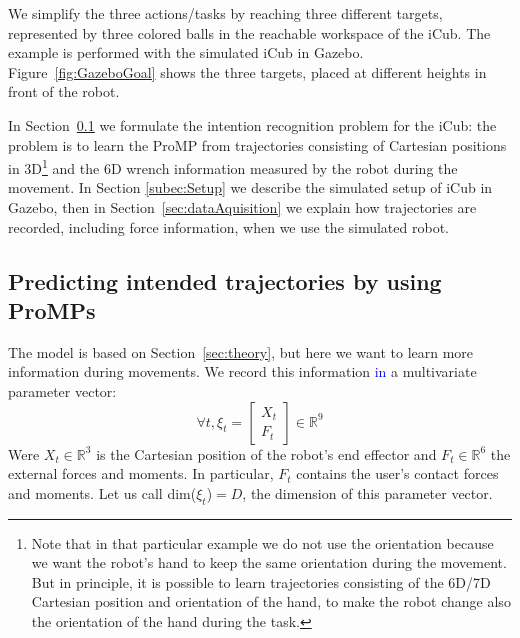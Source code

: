 \documentclass[utf8]{frontiersSCNS} %
\newcommand{\rev}[1]{\textcolor{blue}{#1}}
\begin{document}
We simplify the three actions/tasks by reaching three different targets, represented by three colored balls in the reachable workspace of the iCub. The example is performed with the simulated iCub in Gazebo. Figure~\ref{fig:GazeboGoal} shows the three targets, placed at different heights in front of the robot.

In Section~\ref{sec:formulateModelInt} we formulate the intention recognition problem for the iCub: the problem is to learn the ProMP from trajectories consisting of Cartesian positions in 3D\footnote{Note that in that particular example we do not use the orientation because we want the robot's hand to keep the same orientation during the movement. But in principle, it is possible to learn trajectories consisting of the 6D/7D Cartesian position and orientation of the hand, to make the robot change also the orientation of the hand during the task.} and the 6D wrench information measured by the robot during the movement.
In Section \ref{subec:Setup} we describe the simulated setup of iCub in Gazebo, then in Section~\ref{sec:dataAquisition} we explain how trajectories are recorded, including force information, when we use the simulated robot.


\subsection{Predicting intended trajectories by using ProMPs}\label{sec:formulateModelInt}

The model is based on Section~\ref{sec:theory}, but here we want to learn more information during movements. We record this information \rev{in} a multivariate parameter vector:
$$\forall t, \xi_t=\begin{bmatrix} X_t \\ F_t\end{bmatrix} \in \mathbb{R}^{9}$$ 
Were $X_t \in \mathbb{R}^{3}$ is the Cartesian position of the robot's end effector and $F_t \in \mathbb{R}^6$ the external forces and moments. In particular, $F_t$ contains the user's contact forces and moments. Let us call dim($\xi_t$)$ = D$, the dimension of this parameter vector. %
\end{document}
